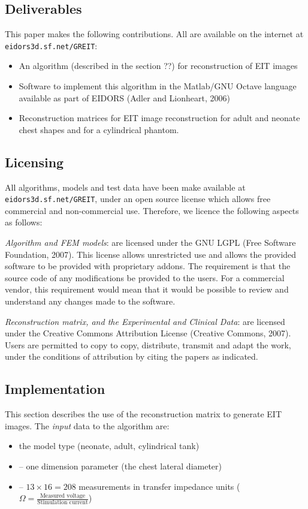\documentclass[letterpaper,twocolumn,11pt]{article}
\begin{document}
\subsection{Deliverables}

This paper makes the following contributions. All are
available on the internet at \verb+eidors3d.sf.net/GREIT+:
\begin{itemize}
\item An algorithm (described in the section ??) for reconstruction
         of EIT images
\item Software to implement this algorithm in the Matlab/GNU Octave
         language available as part of EIDORS (Adler and Lionheart, 2006)
\item Reconstruction matrices for EIT image reconstruction for
      adult and neonate chest shapes and for a cylindrical phantom.
\end{itemize}


\subsection{Licensing}
All algorithms, models and test data have been make
available at \verb+eidors3d.sf.net/GREIT+,
under an open source license which allows
free commercial and non-commercial use. Therefore,
we licence the following aspects as follows:

{\em Algorithm and FEM models}:
   are licensed under the GNU LGPL (Free Software Foundation, 2007).
   This license allows
   unrestricted use and allows the provided software to
   be provided with proprietary addons. The requirement is
   that the source code of any modifications be provided to
   the users. For a commercial vendor, this requirement would
   mean that it would be possible to review and understand any
   changes made to the software.

{\em Reconstruction matrix, and the Experimental and Clinical Data}:
   are licensed under the Creative Commons Attribution
   License (Creative Commons, 2007). Users are permitted
   to copy to copy, distribute, transmit and adapt the work,
   under the conditions of attribution by citing the
   papers as indicated.

\subsection{Implementation }
This section describes the use of the reconstruction
matrix to generate EIT images.
The {\em input} data to the algorithm are:
\begin{itemize}
\item[]
the model type (neonate, adult, cylindrical tank) 
\item[]
   -- one dimension parameter (the chest lateral diameter) 
\item[]
   -- $13\times 16=208$ measurements in transfer impedance units
      ($\Omega = \frac{\mbox{Measured voltage}}
                      {\mbox{Stimulation current}}$)
\end{itemize}
\end{document}
